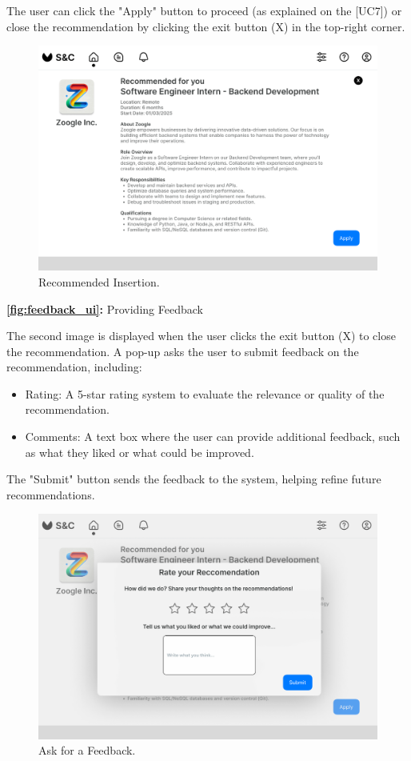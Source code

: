 The user can click the "Apply" button to proceed (as explained on the [UC7]) or close the recommendation by clicking the exit button (X) in the top-right corner.

\begin{figure}[H]
    \centering
    \includegraphics[width=0.75\linewidth]{DD/Images/UI/recommInsertion.png}
    \caption{Recommended Insertion.}
    \label{fig:recomm_insertion_ui}
\end{figure}

\newpage

\textbf{\autoref{fig:feedback_ui}:} Providing Feedback

The second image is displayed when the user clicks the exit button (X) to close the recommendation. A pop-up asks the user to submit feedback on the recommendation, including:

\begin{itemize}
    \item 
Rating: A 5-star rating system to evaluate the relevance or quality of the recommendation.
    \item 
Comments: A text box where the user can provide additional feedback, such as what they liked or what could be improved.
\end{itemize}

The "Submit" button sends the feedback to the system, helping refine future recommendations.

\begin{figure}[H]
    \centering
    \includegraphics[width=0.75\linewidth]{DD/Images/UI/recommInsertionFeedback.png}
    \caption{Ask for a Feedback.}
    \label{fig:feedback_ui}
\end{figure}


